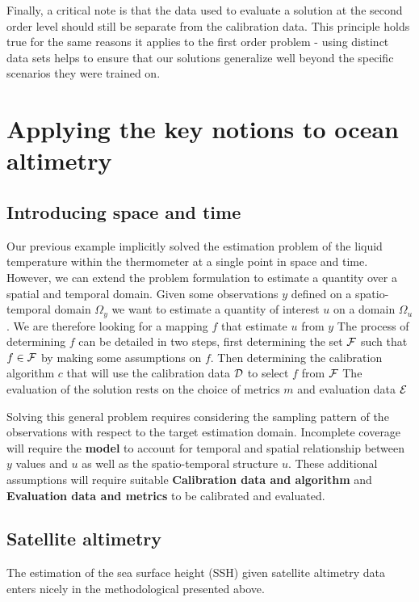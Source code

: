 \begin{bibunit}
Finally, a critical note is that the data used to evaluate a solution at the second order level should still be separate from the calibration data. This principle holds true for the same reasons it applies to the first order problem - using distinct data sets helps to ensure that our solutions generalize well beyond the specific scenarios they were trained on.

\section{Applying the key notions to ocean altimetry}
\subsection*{Introducing space and time}
Our previous example implicitly solved the estimation problem of the liquid temperature within the thermometer at a single point in space and time.
However, we can extend the problem formulation to estimate a quantity over a spatial and temporal domain.
Given some observations $y$ defined on a spatio-temporal domain $\Omega_y$ we want to estimate a quantity of interest $u$ on a domain $\Omega_u$. We are therefore looking for a mapping $f$ that estimate $u$ from $y$
The process of determining $f$ can be detailed in two steps, first determining the set $\cal{F}$ such that $f \in \cal{F}$ by making some assumptions on $f$. Then determining the calibration algorithm $c$ that will use the calibration data $\cal{D}$ to select $f$ from $\cal{F}$
The evaluation of the solution rests on the choice of metrics $m$ and evaluation data $\cal{E}$

Solving this general problem requires considering the sampling pattern of the observations with respect to the target estimation domain.
Incomplete coverage will require the \textbf{model} to account for temporal and spatial relationship between $y$ values and $u$ as well as the spatio-temporal structure $u$.
These additional assumptions will require suitable \textbf{Calibration data and algorithm} and \textbf{Evaluation data and metrics} to be calibrated and evaluated.



\subsection*{Satellite altimetry}


The estimation of the sea surface height (SSH) given satellite altimetry data enters nicely in the methodological presented above.


\end{bibunit}

